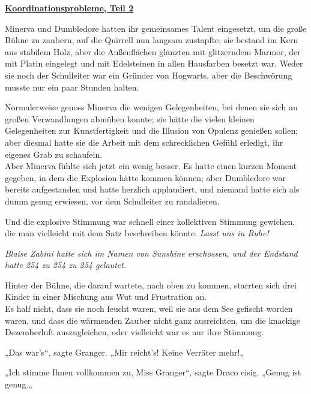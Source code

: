 

\hypertarget{koordinationsprobleme-teil-2}{%

\textbf{\uline{Koordinationsprobleme, Teil 2}}

\hfill\break Minerva und Dumbledore hatten ihr gemeinsames Talent eingesetzt, um die große Bühne zu zaubern, auf die Quirrell nun langsam zustapfte; sie bestand im Kern aus stabilem Holz, aber die Außenflächen glänzten mit glitzerndem Marmor, der mit Platin eingelegt und mit Edelsteinen in allen Hausfarben besetzt war. Weder sie noch der Schulleiter war ein Gründer von Hogwarts, aber die Beschwörung musste nur ein paar Stunden halten.

Normalerweise genoss Minerva die wenigen Gelegenheiten, bei denen sie sich an großen Verwandlungen abmühen konnte; sie hätte die vielen kleinen Gelegenheiten zur Kunstfertigkeit und die Illusion von Opulenz genießen sollen; aber diesmal hatte sie die Arbeit mit dem schrecklichen Gefühl erledigt, ihr eigenes Grab zu schaufeln.\\ Aber Minerva fühlte sich jetzt ein wenig besser. Es hatte einen kurzen Moment gegeben, in dem die Explosion hätte kommen können; aber Dumbledore war bereits aufgestanden und hatte herzlich applaudiert, und niemand hatte sich als dumm genug erwiesen, vor dem Schulleiter zu randalieren.

Und die explosive Stimmung war schnell einer kollektiven Stimmung gewichen, die man vielleicht mit dem Satz beschreiben könnte: \emph{Lasst uns in Ruhe!}

\emph{Blaise Zabini hatte sich im Namen von Sunshine erschossen, und der Endstand hatte 254 zu 254 zu 254 gelautet.}

Hinter der Bühne, die darauf wartete, nach oben zu kommen, starrten sich drei Kinder in einer Mischung aus Wut und Frustration an.\\ Es half nicht, dass sie noch feucht waren, weil sie aus dem See gefischt worden waren, und dass die wärmenden Zauber nicht ganz ausreichten, um die knackige Dezemberluft auszugleichen, oder vielleicht war es nur ihre Stimmung.

„Das war's“, sagte Granger. „Mir reicht's! Keine Verräter mehr!„

„Ich stimme Ihnen vollkommen zu, Miss Granger“, sagte Draco eisig. „Genug ist genug.„

}
